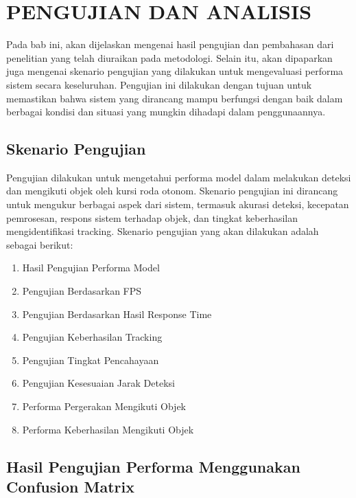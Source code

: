 \chapter{PENGUJIAN DAN ANALISIS}
\label{chap:pengujiananalisis}


Pada bab ini, akan dijelaskan mengenai hasil pengujian dan pembahasan dari penelitian yang telah diuraikan pada metodologi. Selain itu, akan dipaparkan juga mengenai skenario pengujian yang dilakukan untuk mengevaluasi performa sistem secara keseluruhan. Pengujian ini dilakukan dengan tujuan untuk memastikan bahwa sistem yang dirancang mampu berfungsi dengan baik dalam berbagai kondisi dan situasi yang mungkin dihadapi dalam penggunaannya.

\section{Skenario Pengujian}
\label{sec:skenariopengujian}

Pengujian dilakukan untuk mengetahui performa model dalam melakukan deteksi dan mengikuti objek oleh kursi roda otonom. Skenario pengujian ini dirancang untuk mengukur berbagai aspek dari sistem, termasuk akurasi deteksi, kecepatan pemrosesan, respons sistem terhadap objek, dan tingkat keberhasilan mengidentifikasi tracking. Skenario pengujian yang akan dilakukan adalah sebagai berikut:

\begin{enumerate}
    \item Hasil Pengujian Performa Model
    \item Pengujian Berdasarkan FPS
    \item Pengujian Berdasarkan Hasil Response Time
    \item Pengujian Keberhasilan Tracking
    \item Pengujian Tingkat Pencahayaan
    \item Pengujian Kesesuaian Jarak Deteksi
    \item Performa Pergerakan Mengikuti Objek
    \item Performa Keberhasilan Mengikuti Objek
\end{enumerate}

\newpage
\section{Hasil Pengujian Performa Menggunakan Confusion Matrix}
\label{sec:hasilperformaconfisionMatrix}

